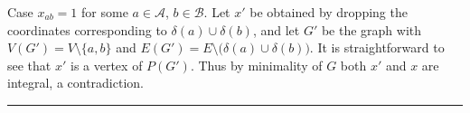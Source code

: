 \documentclass[3p,times]{elsarticle}
\newenvironment{proof}{{\bf Proof:  }}{\hfill\rule{2mm}{2mm}}
\begin{document}
\begin{proof}
Case $x_{ab}=1$ for some $a\in \mathcal{A}$, $b\in\mathcal{B}$. Let
$x'$ be obtained by dropping the coordinates corresponding to
$\delta(a)\cup\delta(b)$, and let $G'$ be the graph with
$V(G')=V\setminus\{a,b\}$ and
$E(G') = E \setminus \big(\delta(a)\cup\delta(b)\big)$. It is
straightforward to see that $x'$ is a vertex of $P(G')$. Thus by
minimality of $G$ both $x'$ and $x$ are integral, a contradiction.
\end{proof}




\end{document}
